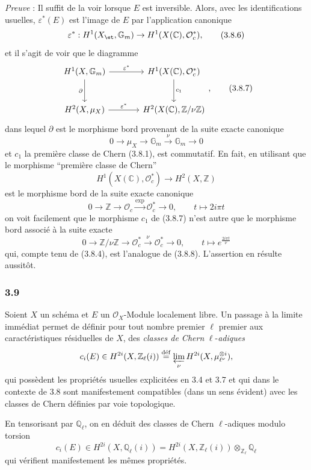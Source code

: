 \emph{Preuve} : Il suffit de la voir lorsque $E$ est inversible. Alors, avec les identifications usuelles, $\varepsilon^*(E)$ est l'image de $E$ par l'application canonique
\[
\varepsilon^*:H^1(X_{\et},\mathbb{G}_m)\to H^1(X(\mathbb{C}),\mathcal{O}_c^*),
\tag{3.8.6}
\]
et il s'agit de voir que le diagramme
\[
\begin{tikzcd}[column sep=large,row sep=large]
H^1(X,\mathbb{G}_m) \arrow[r,"\varepsilon^*"] \arrow[d,"\partial"'] &
H^1(X(\mathbb{C}),\mathcal{O}_c^*) \arrow[d,"c_1"]\\
H^2(X,\mu_X) \arrow[r,"\varepsilon^*"] &
H^2(X(\mathbb{C}),\mathbb{Z}/\nu\mathbb{Z})
\end{tikzcd},
\tag{3.8.7}
\]
dans lequel $\partial$ est le morphisme bord provenant de la suite exacte canonique
\[
0\to \mu_X\to\mathbb{G}_m\xrightarrow{\nu}\mathbb{G}_m\to0
\tag{3.8.8}
\]
et $c_1$ la première classe de Chern (3.8.1), est commutatif. En fait, en utilisant que le morphisme ``première classe de Chern''
\[
H^1(X(\mathbb{C}),\mathcal{O}_c^*)\to H^2(X,\mathbb{Z})
\]
est le morphisme bord de la suite exacte canonique
\[
0\to\mathbb{Z}\to\mathcal{O}_c\xrightarrow{\exp}\mathcal{O}_c^*\to0,
\qquad
t\mapsto 2i\pi t
\]
on voit facilement que le morphisme $c_1$ de (3.8.7) n'est autre que le morphisme bord associé à la suite exacte
\[
0\to\mathbb{Z}/\nu\mathbb{Z}\to\mathcal{O}_c^*\xrightarrow{\nu}\mathcal{O}_c^*\to0,
\qquad
t\mapsto e^{\frac{2i\pi t}{\nu}}
\]
qui, compte tenu de (3.8.4), est l'analogue de (3.8.8). L'assertion en résulte aussitôt.

\subsubsection*{3.9}
Soient $X$ un schéma et $E$ un $\mathcal{O}_X$-Module localement libre. Un passage à la limite immédiat permet de définir pour tout nombre premier $\ell$ premier aux caractéristiques résiduelles de $X$, des \emph{classes de Chern} $\ell$-\emph{adiques}
\[
c_i(E)\in H^{2i}(X,\mathbb{Z}_\ell(i))
\stackrel{\mathrm{d\acute{e}f}}{=}\varprojlim_\nu H^{2i}(X,\mu_{\ell^\nu}^{\otimes i}),
\]
qui
possèdent les propriétés usuelles explicitées en 3.4 et 3.7 et qui dans le contexte de 3.8 sont manifestement compatibles (dans un sens évident) avec les classes de Chern définies par voie topologique.

En tensorisant par $\mathbb{Q}_\ell$, on en déduit des classes de Chern $\ell$-adiques modulo torsion
\[
c_i(E)\in H^{2i}(X,\mathbb{Q}_\ell(i))
=H^{2i}(X,\mathbb{Z}_\ell(i))\otimes_{\mathbb{Z}_\ell}\mathbb{Q}_\ell
\]
qui vérifient manifestement les mêmes propriétés.

